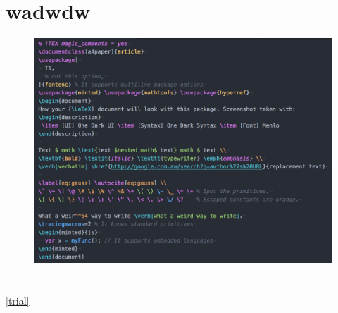 \documentclass{article}
\begin{document}

\section{wadwdw}







\begin{figure}[h t p b] %
  \centering
  \includegraphics[width=\textwidth]{./fig1}
\caption{}
  \label{}
\end{figure}
\section{}

\ref{trial}
\end{document}

